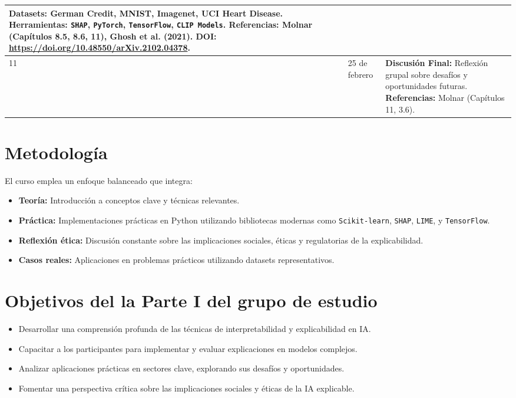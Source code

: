 \begin{longtable}{|p{1.2cm}|p{2.8cm}|p{9.5cm}|}
\textbf{Datasets:} German Credit, MNIST, Imagenet, UCI Heart Disease. 
\textbf{Herramientas:} \texttt{SHAP}, \texttt{PyTorch}, \texttt{TensorFlow}, \texttt{CLIP Models}. 
\textbf{Referencias:} Molnar (Capítulos 8.5, 8.6, 11), Ghosh et al. (2021). DOI: \url{https://doi.org/10.48550/arXiv.2102.04378}. \\
\hline
11 & 25 de febrero & \textbf{Discusión Final:} 
Reflexión grupal sobre desafíos y oportunidades futuras. 
\textbf{Referencias:} Molnar (Capítulos 11, 3.6). \\
\hline
\end{longtable}




\section*{Metodología}
El curso emplea un enfoque balanceado que integra:
\begin{itemize}
    \item \textbf{Teoría:} Introducción a conceptos clave y técnicas relevantes.
    \item \textbf{Práctica:} Implementaciones prácticas en Python utilizando bibliotecas modernas como \texttt{Scikit-learn}, \texttt{SHAP}, \texttt{LIME}, y \texttt{TensorFlow}.
    \item \textbf{Reflexión ética:} Discusión constante sobre las implicaciones sociales, éticas y regulatorias de la explicabilidad.
    \item \textbf{Casos reales:} Aplicaciones en problemas prácticos utilizando datasets representativos.
\end{itemize}

\section*{Objetivos del la Parte I del grupo de estudio}
\begin{itemize}
    \item Desarrollar una comprensión profunda de las técnicas de interpretabilidad y explicabilidad en IA.
    \item Capacitar a los participantes para implementar y evaluar explicaciones en modelos complejos.
    \item Analizar aplicaciones prácticas en sectores clave, explorando sus desafíos y oportunidades.
    \item Fomentar una perspectiva crítica sobre las implicaciones sociales y éticas de la IA explicable.
\end{itemize}


